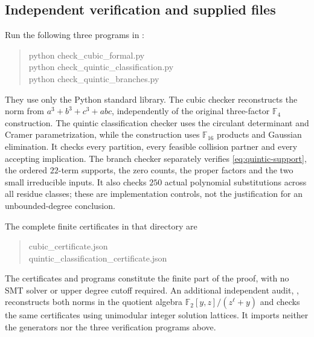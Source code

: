 \documentclass[11pt]{article}
\theoremstyle{definition}
\theoremstyle{remark}
\begin{document}
\subsection{Independent verification and supplied files}
Run the following three programs in :
\begin{quote}\small\ttfamily
python check\_cubic\_formal.py\\
python check\_quintic\_classification.py\\
python check\_quintic\_branches.py
\end{quote}
They use only the Python standard library.
The cubic checker reconstructs the norm from
$a^3+b^3+c^3+abc$, independently of the original
three-factor $\mathbb F_4$ construction.
The quintic classification checker uses the circulant determinant
and Cramer parametrization, while the construction uses
$\mathbb F_{16}$ products and Gaussian elimination.
It checks every partition, every feasible collision partner and
every accepting implication.
The branch checker separately verifies
\eqref{eq:quintic-support}, the ordered $22$-term supports,
the zero counts, the proper factors and the two small irreducible
inputs. It also checks $250$ actual polynomial substitutions
across all residue classes; these are implementation controls,
not the justification for an unbounded-degree conclusion.

The complete finite certificates in that directory are
\begin{quote}\small\ttfamily
cubic\_certificate.json\\
quintic\_classification\_certificate.json
\end{quote}
The certificates and programs constitute the finite part of the
proof, with no SMT solver or upper degree cutoff required.
An additional independent audit, ,
reconstructs both norms in the quotient algebra
$\mathbb F_2[y,z]/(z^\ell+y)$ and checks the same certificates using
unimodular integer solution lattices. It imports neither the generators
nor the three verification programs above.


\clearpage
\end{document}

